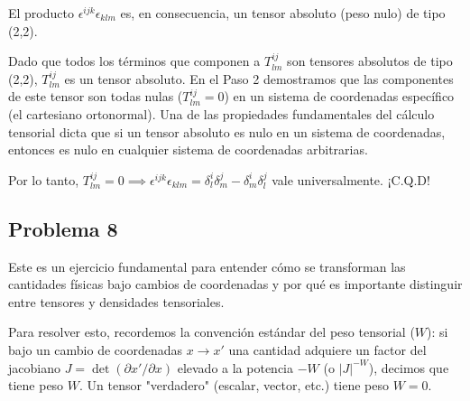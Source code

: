 \documentclass[11pt,spanish]{article}
\begin{document}
\begin{itemize}
El producto $\epsilon^{ijk}\epsilon_{klm}$ es, en consecuencia, un tensor absoluto (peso nulo) de tipo (2,2).

Dado que todos los términos que componen a $T^{ij}_{lm}$ son tensores absolutos de tipo (2,2), $T^{ij}_{lm}$ es un tensor absoluto. 
En el Paso 2 demostramos que las componentes de este tensor son todas nulas ($T^{ij}_{lm} = 0$) en un sistema de coordenadas específico (el cartesiano ortonormal). Una de las propiedades fundamentales del cálculo tensorial dicta que si un tensor absoluto es nulo en un sistema de coordenadas, entonces es nulo en cualquier sistema de coordenadas arbitrarias.

Por lo tanto, $T^{ij}_{lm} = 0 \implies \epsilon^{ijk}\epsilon_{klm} = \delta^i_l\delta^j_m - \delta^i_m\delta^j_l$ vale universalmente. ¡C.Q.D!
\end{itemize}

\subsection*{Problema 8}

Este es un ejercicio fundamental para entender cómo se transforman las cantidades físicas bajo cambios de coordenadas y por qué es importante distinguir entre tensores y densidades tensoriales.

Para resolver esto, recordemos la convención estándar del peso tensorial ($W$): si bajo un cambio de coordenadas $x \to x'$ una cantidad adquiere un factor del jacobiano $J = \det(\partial x' / \partial x)$ elevado a la potencia $-W$ (o $|J|^{-W}$), decimos que tiene peso $W$. Un tensor "verdadero" (escalar, vector, etc.) tiene peso $W=0$.
\end{document}
